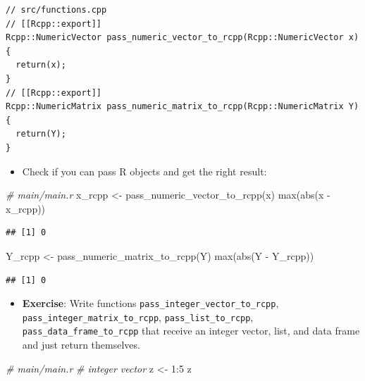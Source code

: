 \documentclass[
]{book}
\newenvironment{Shaded}{\begin{snugshade}}{\end{snugshade}}
\newcommand{\CommentTok}[1]{\textcolor[rgb]{0.56,0.35,0.01}{\textit{#1}}}
\newcommand{\DecValTok}[1]{\textcolor[rgb]{0.00,0.00,0.81}{#1}}
\newcommand{\FunctionTok}[1]{\textcolor[rgb]{0.00,0.00,0.00}{#1}}
\newcommand{\NormalTok}[1]{#1}
\newcommand{\OtherTok}[1]{\textcolor[rgb]{0.56,0.35,0.01}{#1}}
\newcommand{\SpecialCharTok}[1]{\textcolor[rgb]{0.00,0.00,0.00}{#1}}
\providecommand{\tightlist}{%
  \setlength{\itemsep}{0pt}\setlength{\parskip}{0pt}}
\begin{document}
\begin{verbatim}
// src/functions.cpp
// [[Rcpp::export]]
Rcpp::NumericVector pass_numeric_vector_to_rcpp(Rcpp::NumericVector x) {
  return(x);
}
// [[Rcpp::export]]
Rcpp::NumericMatrix pass_numeric_matrix_to_rcpp(Rcpp::NumericMatrix Y) {
  return(Y);
}
\end{verbatim}

\begin{itemize}
\tightlist
\item
  Check if you can pass R objects and get the right result:
\end{itemize}

\begin{Shaded}
\begin{Highlighting}[]
\CommentTok{\# main/main.r}
\NormalTok{x\_rcpp }\OtherTok{\textless{}{-}} \FunctionTok{pass\_numeric\_vector\_to\_rcpp}\NormalTok{(x)}
\FunctionTok{max}\NormalTok{(}\FunctionTok{abs}\NormalTok{(x }\SpecialCharTok{{-}}\NormalTok{ x\_rcpp))}
\end{Highlighting}
\end{Shaded}

\begin{verbatim}
## [1] 0
\end{verbatim}

\begin{Shaded}
\begin{Highlighting}[]
\NormalTok{Y\_rcpp }\OtherTok{\textless{}{-}} \FunctionTok{pass\_numeric\_matrix\_to\_rcpp}\NormalTok{(Y)}
\FunctionTok{max}\NormalTok{(}\FunctionTok{abs}\NormalTok{(Y }\SpecialCharTok{{-}}\NormalTok{ Y\_rcpp))}
\end{Highlighting}
\end{Shaded}

\begin{verbatim}
## [1] 0
\end{verbatim}

\begin{itemize}
\tightlist
\item
  \textbf{Exercise}: Write functions \texttt{pass\_integer\_vector\_to\_rcpp}, \texttt{pass\_integer\_matrix\_to\_rcpp}, \texttt{pass\_list\_to\_rcpp}, \texttt{pass\_data\_frame\_to\_rcpp} that receive an integer vector, list, and data frame and just return themselves.
\end{itemize}

\begin{Shaded}
\begin{Highlighting}[]
\CommentTok{\# main/main.r}
\CommentTok{\# integer vector}
\NormalTok{z }\OtherTok{\textless{}{-}} \DecValTok{1}\SpecialCharTok{:}\DecValTok{5}
\NormalTok{z}
\end{Highlighting}
\end{Shaded}
\end{document}
